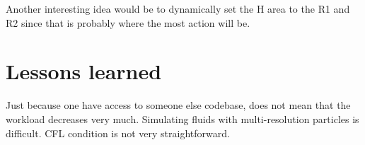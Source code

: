 \documentclass[../../main.tex]{subfiles}
\begin{document}
Another interesting idea would be to dynamically set the H area to the R1 and R2 since that is probably where the most action will be.

\section{Lessons learned}
Just because one have access to someone else codebase, does not mean that the workload decreases very much. Simulating fluids with multi-resolution particles is difficult. CFL condition is not very straightforward. 
\end{document}
